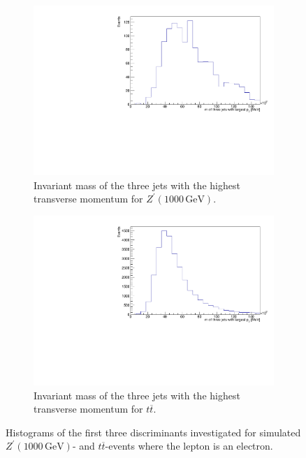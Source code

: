 \begin{figure}[H]
\begin{subfigure}{0.49\textwidth}
    \includegraphics[width=\textwidth]{plots/discriminant/zprime1000.el_dis3.pdf}%
    \caption{Invariant mass of the three jets with the highest transverse momentum for $Z^\prime(1000 \, \si{\giga\eV})$.}%
    \label{fig:5e}%
  \end{subfigure}%
  \hfill
  \begin{subfigure}{0.49\textwidth}%
    \centering%
    \includegraphics[width=\textwidth]{plots/discriminant/ttbar.el_dis3.pdf}%
    \caption{Invariant mass of the three jets with the highest transverse momentum for $t \overline{t}$.}%
    \label{fig:5f}%
  \end{subfigure}%
   \caption{Histograms of the first three discriminants investigated for simulated $Z^\prime(1000 \, \si{\giga\eV})$- and $t \overline{t}$-events where the lepton
   is an electron.}%
   \label{fig:5}%
 \end{figure}

